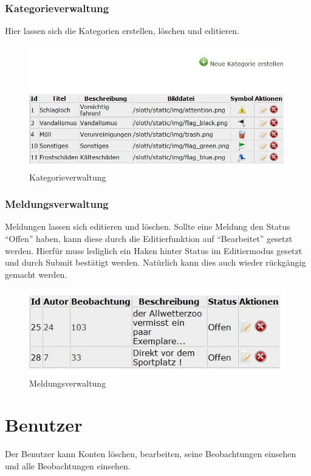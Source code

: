 \documentclass[a4paper,11pt]{scrartcl}
\begin{document}
\newpage
\subsubsection{Kategorieverwaltung}
Hier lassen sich die Kategorien erstellen, löschen und editieren.
\begin{figure}[h]
\centering
\includegraphics[width = 10 cm]{img/Kategorieverwaltung}
\caption{Kategorieverwaltung}
\label{Kategorieverwaltung}
\end{figure}

\subsubsection{Meldungsverwaltung}
Meldungen lassen sich editieren und löschen. Sollte eine Meldung den Status "`Offen"' haben, kann diese durch die Editierfunktion auf "`Bearbeitet"' gesetzt werden. Hierfür muss lediglich ein Haken hinter Status im Editiermodus gesetzt und durch Submit bestätigt werden. Natürlich kann dies auch wieder rückgängig gemacht werden.
\begin{figure}[h]
\centering
\includegraphics[width = 10 cm]{img/Meldungsverwaltung}
\caption{Meldungsverwaltung}
\label{Meldungsverwaltung}
\end{figure}

\newpage

\section{Benutzer}
Der Benutzer kann Konten löschen, bearbeiten, seine Beobachtungen einsehen und alle Beobachtungen einsehen.
\end{document}
